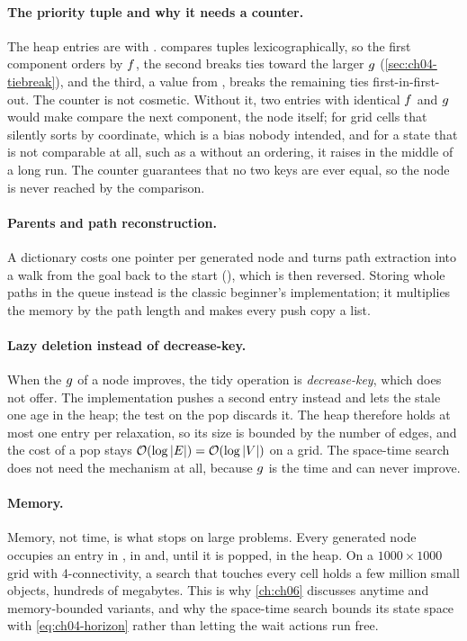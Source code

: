 \paragraph{The priority tuple and why it needs a counter.}
The heap entries are  with
. \python compares tuples lexicographically, so the
first component orders by $f$, the second breaks ties toward the larger
$g$ (\cref{sec:ch04-tiebreak}), and the third, a value from
, breaks the remaining ties first-in-first-out. The
counter is not cosmetic. Without it, two entries with identical $f$ and
$g$ would make  compare the next component, the node itself;
for grid cells that silently sorts by coordinate, which is a bias nobody
intended, and for a state that is not comparable at all, such as a
 without an ordering, it raises  in the middle
of a long run. The counter guarantees that no two keys are ever equal, so the
node is never reached by the comparison.

\paragraph{Parents and path reconstruction.}
A dictionary  costs one pointer per generated
node and turns path extraction into a walk from the goal back to the start
(), which is then reversed. Storing whole paths in the
queue instead is the classic beginner's implementation; it multiplies the memory
by the path length and makes every push copy a list.

\paragraph{Lazy deletion instead of decrease-key.}
When the $g$ of a node improves, the tidy operation is
\emph{decrease-key}, which  does not offer. The implementation
pushes a second entry instead and lets the stale one age in the heap; the test
 on the pop discards it. The heap therefore holds at most
one entry per relaxation, so its size is bounded by the number of edges, and the
cost of a pop stays $\mathcal{O}\!\left(\log \left\lvert E \right\rvert\right) = \mathcal{O}\!\left(\log \left\lvert V \right\rvert\right)$ on a grid. The
space-time search does not need the mechanism at all, because $g$ is the
time and can never improve.

\paragraph{Memory.}
Memory, not time, is what stops \astar on large problems. Every generated node
occupies an entry in , in  and, until it is popped, in the
heap. On a $1000 \times 1000$ grid with 4-connectivity, a search that touches
every cell holds a few million small \python objects, hundreds of megabytes.
This is why \cref{ch:ch06} discusses anytime and memory-bounded variants, and
why the space-time search bounds its state space with \cref{eq:ch04-horizon}
rather than letting the wait actions run free.

